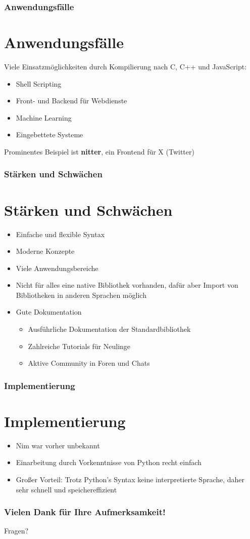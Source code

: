 \documentclass{beamer}
\begin{document}
\begin{frame}
\frametitle{Anwendungsfälle}
\section{Anwendungsfälle}
Viele Einsatzmöglichkeiten durch Kompilierung nach C, C++ und JavaScript:
\begin{itemize}
	\item Shell Scripting
	\item Front- und Backend für Webdienste
	\item Machine Learning
	\item Eingebettete Systeme
\end{itemize}

Prominentes Beispiel ist \textbf{nitter}, ein Frontend für X (Twitter)
\end{frame}


\begin{frame}
\frametitle{Stärken und Schwächen}
\section{Stärken und Schwächen}
\begin{itemize}
	\item Einfache und flexible Syntax
	\item Moderne Konzepte
	\item Viele Anwendungsbereiche
	\item Nicht für alles eine native Bibliothek vorhanden, dafür aber Import von Bibliotheken in anderen Sprachen möglich
	\item Gute Dokumentation
	\begin{itemize}
		\item Ausführliche Dokumentation der Standardbibliothek
		\item Zahlreiche Tutorials für Neulinge
		\item Aktive Community in Foren und Chats
	\end{itemize}
\end{itemize}
\end{frame}


\begin{frame}
\frametitle{Implementierung}
\section{Implementierung}
\begin{itemize}
	\item Nim war vorher unbekannt
	\item Einarbeitung durch Vorkenntnisse von Python recht einfach
	\item Großer Vorteil: Trotz Python's Syntax keine interpretierte Sprache, daher sehr schnell und speichereffizient
\end{itemize}
\end{frame}

\appendix

\begin{frame}
\frametitle{Vielen Dank für Ihre Aufmerksamkeit!}
Fragen?
\end{frame}
\end{document}
